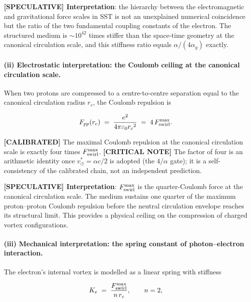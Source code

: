 \documentclass[11pt]{article}
\theoremstyle{definition}
\theoremstyle{plain}
\theoremstyle{remark}
\newcommand{\rc}{{r_c}}
\newcommand{\vchar}{v_{\!\boldsymbol{\circlearrowleft}}^{\ast}}
\begin{document}
        \textbf{[SPECULATIVE] Interpretation}: the hierarchy between the electromagnetic and gravitational force scales in SST is not an unexplained numerical coincidence but the ratio of the two fundamental coupling constants of the electron. The structured medium is $\sim\!10^{42}$ times stiffer than the space-time geometry at the canonical circulation scale, and this stiffness ratio equals $\alpha/(4\alpha_g)$ exactly.

        \paragraph{(ii) Electrostatic interpretation: the Coulomb ceiling at the canonical circulation scale.}

        When two protons are compressed to a centre-to-centre separation equal to the canonical circulation radius $\rc$, the Coulomb repulsion is

        \begin{align}
            F_{pp}(\rc)
            \;=\; \frac{e^2}{4\pi\varepsilon_0 \rc^2}
            \;=\; 4\,F_{\rm swirl}^{\max}.
            \label{eq:Coulomb_core}
        \end{align}

        \textbf{[CALIBRATED]} The maximal Coulomb repulsion at the canonical circulation scale is exactly four times $F_{\rm swirl}^{\max}$. \textbf{[CRITICAL NOTE]} The factor of four is an arithmetic identity once $\vchar=\alpha c/2$ is adopted (the $4/\alpha$ gate); it is a self-consistency of the calibrated chain, not an independent prediction.

        \textbf{[SPECULATIVE] Interpretation}: $F_{\rm swirl}^{\max}$ is the quarter-Coulomb force at the canonical circulation scale. The medium sustains one quarter of the maximum proton--proton Coulomb repulsion before the neutral circulation envelope reaches its structural limit. This provides a physical ceiling on the compression of charged vortex configurations.

        \paragraph{(iii) Mechanical interpretation: the spring constant of photon--electron interaction.}

        The electron's internal vortex is modelled as a linear spring with stiffness

        \begin{align}
            K_e \;=\; \frac{F_{\rm swirl}^{\max}}{n\,\rc},
            \qquad n = 2,
            \label{eq:spring_K}
        \end{align}
\end{document}
